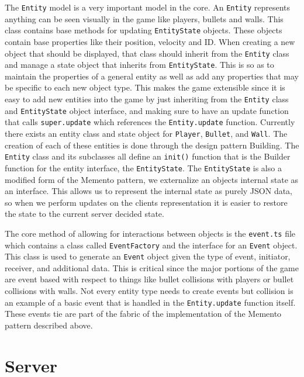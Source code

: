 \documentclass[12pt]{report}
\begin{document}
The \texttt{Entity} model is a very important model in the core. An \texttt{Entity} represents anything can be seen visually in the game like players, bullets and walls. This class contains base methods for updating \texttt{EntityState} objects. These objects contain base properties like their position, velocity and ID. When creating a new object that should be displayed, that class should inherit from the \texttt{Entity} class and manage a state object that inherits from \texttt{EntityState}. This is so as to maintain the properties of a general entity as well as add any properties that may be specific to each new object type. This makes the game extensible since it is easy to add new entities into the game by just inheriting from the \texttt{Entity} class and \texttt{EntityState} object interface, and making sure to have an update function that calls \texttt{super.update} which references the \texttt{Entity.update} function. Currently there exists an entity class and state object for \texttt{Player}, \texttt{Bullet}, and \texttt{Wall}. The creation of each of these entities is done through the design pattern Building. The \texttt{Entity} class and its subclasses all define an \texttt{init()} function that is the Builder function for the entity interface, the \texttt{EntityState}. The \texttt{EntityState} is also a modified form of the Memento pattern, we externalize an objects internal state as an interface. This allows us to represent the internal state as purely JSON data, so when we perform updates on the clients representation it is easier to restore the state to the current server decided state. 


The core method of allowing for interactions between objects is the \texttt{event.ts} file which contains a class called \texttt{EventFactory} and the interface for an \texttt{Event} object. This class is used to generate an \texttt{Event} object given the type of event, initiator, receiver, and additional data. This is critical since the major portions of the game are event based with respect to things like bullet collisions with players or bullet collisions with walls. Not every entity type needs to create events but collision is an example of a basic event that is handled in the \texttt{Entity.update} function itself. These events tie are part of the fabric of the implementation of the Memento pattern described above. 


\section{Server}
\end{document}
